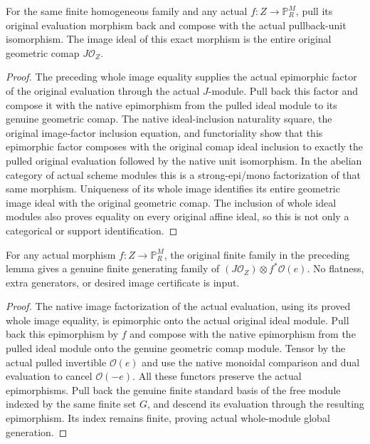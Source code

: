 \begin{lemma}
\label{lem:c0n-original-pulled-evaluation-image}
\leanok
For the same finite homogeneous family and any actual $f:Z\to\mathbb P^M_R$,
pull its original evaluation morphism back and compose with the actual
pullback-unit isomorphism.  The image ideal of this exact morphism is the
entire original geometric comap $J\mathcal O_Z$.
\end{lemma}
\begin{proof}
The preceding whole image equality supplies the actual epimorphic factor
of the original evaluation through the actual $J$-module.  Pull back this
factor and compose it with the native epimorphism from the pulled ideal
module to its genuine geometric comap.  The native ideal-inclusion
naturality square, the original image-factor inclusion equation, and
functoriality show that this epimorphic factor composes with the original
comap ideal inclusion to exactly the pulled original evaluation followed
by the native unit isomorphism.  In the abelian category of actual scheme
modules this is a strong-epi/mono factorization of that same morphism.
Uniqueness of its whole image identifies its entire geometric image ideal
with the original geometric comap.  The inclusion of whole ideal modules
also proves equality on every original affine ideal, so this is not only
a categorical or support identification.
\end{proof}

\begin{lemma}
\label{lem:c0n-original-homogeneous-pullback-generation}
\leanok
For any actual morphism $f:Z\to\mathbb P^M_R$, the original finite family
in the preceding lemma gives a genuine finite generating family of
$(J\mathcal O_Z)\otimes f^*\mathcal O(e)$.
No flatness, extra generators, or desired image certificate is input.
\end{lemma}
\begin{proof}
The native image factorization of the actual evaluation, using its proved
whole image equality, is epimorphic onto the actual original ideal module.
Pull back this epimorphism by $f$ and compose with the native epimorphism
from the pulled ideal module onto the genuine geometric comap module.
Tensor by the actual pulled invertible $\mathcal O(e)$ and use the native
monoidal comparison and dual evaluation to cancel $\mathcal O(-e)$.
All these functors preserve the actual epimorphisms.  Pull back the genuine
finite standard basis of the free module indexed by the same finite set
$G$, and descend its evaluation through the resulting epimorphism.
Its index remains finite, proving actual whole-module global generation.
\end{proof}

